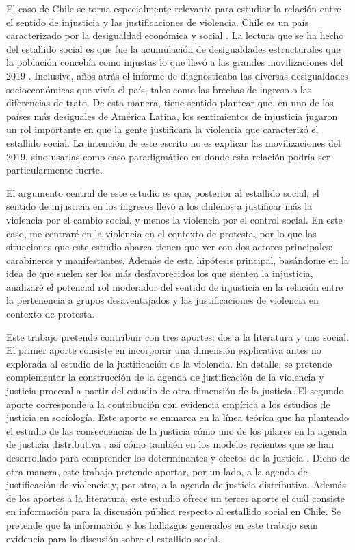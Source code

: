 \documentclass[12pt,twoside]{templates/facsothesis}
\begin{document}
El caso de Chile se torna especialmente relevante para estudiar la relación entre el sentido de injusticia y las justificaciones de violencia. Chile es un país caracterizado por la desigualdad económica y social \citep{PNUD2017}. La lectura que se ha hecho del estallido social es que fue la acumulación de desigualdades estructurales que la población concebía como injustas lo que llevó a las grandes movilizaciones del 2019 \citep{Somma2020}. Inclusive, años atrás el informe de \citet{PNUD2017} diagnosticaba las diversas desigualdades socioeconómicas que vivía el país, tales como las brechas de ingreso o las diferencias de trato. De esta manera, tiene sentido plantear que, en uno de los países más desiguales de América Latina, los sentimientos de injusticia jugaron un rol importante en que la gente justificara la violencia que caracterizó el estallido social. La intención de este escrito no es explicar las movilizaciones del 2019, sino usarlas como caso paradigmático en donde esta relación podría ser particularmente fuerte.

El argumento central de este estudio es que, posterior al estallido social, el sentido de injusticia en los ingresos llevó a los chilenos a justificar más la violencia por el cambio social, y menos la violencia por el control social. En este caso, me centraré en la violencia en el contexto de protesta, por lo que las situaciones que este estudio abarca tienen que ver con dos actores principales: carabineros y manifestantes. Además de esta hipótesis principal, basándome en la idea de que suelen ser los más desfavorecidos los que sienten la injusticia, analizaré el potencial rol moderador del sentido de injusticia en la relación entre la pertenencia a grupos desaventajados y las justificaciones de violencia en contexto de protesta.

Este trabajo pretende contribuir con tres aportes: dos a la literatura y uno social. El primer aporte consiste en incorporar una dimensión explicativa antes no explorada al estudio de la justificación de la violencia. En detalle, se pretende complementar la construcción de la agenda de justificación de la violencia y justicia procesal a partir del estudio de otra dimensión de la justicia. El segundo aporte corresponde a la contribución con evidencia empírica a los estudios de justicia en sociología. Este aporte se enmarca en la línea teórica que ha planteado el estudio de las consecuencias de la justicia cómo uno de los pilares en la agenda de justicia distributiva \citep{Jasso2015}, así cómo también en los modelos recientes que se han desarrollado para comprender los determinantes y efectos de la justicia \citep{Liebig2016}. Dicho de otra manera, este trabajo pretende aportar, por un lado, a la agenda de justificación de violencia y, por otro, a la agenda de justicia distributiva. Además de los aportes a la literatura, este estudio ofrece un tercer aporte el cuál consiste en información para la discusión pública respecto al estallido social en Chile. Se pretende que la información y los hallazgos generados en este trabajo sean evidencia para la discusión sobre el estallido social.
\end{document}
